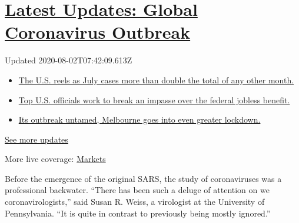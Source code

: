 \hypertarget{latest-updates-global-coronavirus-outbreak}{%
\section{\texorpdfstring{\href{https://www.nytimes.com/2020/08/01/world/coronavirus-covid-19.html?action=click\&pgtype=Article\&state=default\&region=MAIN_CONTENT_1\&context=storylines_live_updates}{Latest
Updates: Global Coronavirus
Outbreak}}{Latest Updates: Global Coronavirus Outbreak}}\label{latest-updates-global-coronavirus-outbreak}}

Updated 2020-08-02T07:42:09.613Z

\begin{itemize}
\tightlist
\item
  \href{https://www.nytimes.com/2020/08/01/world/coronavirus-covid-19.html?action=click\&pgtype=Article\&state=default\&region=MAIN_CONTENT_1\&context=storylines_live_updates\#link-34047410}{The
  U.S. reels as July cases more than double the total of any other
  month.}
\item
  \href{https://www.nytimes.com/2020/08/01/world/coronavirus-covid-19.html?action=click\&pgtype=Article\&state=default\&region=MAIN_CONTENT_1\&context=storylines_live_updates\#link-780ec966}{Top
  U.S. officials work to break an impasse over the federal jobless
  benefit.}
\item
  \href{https://www.nytimes.com/2020/08/01/world/coronavirus-covid-19.html?action=click\&pgtype=Article\&state=default\&region=MAIN_CONTENT_1\&context=storylines_live_updates\#link-2bc8948}{Its
  outbreak untamed, Melbourne goes into even greater lockdown.}
\end{itemize}

\href{https://www.nytimes.com/2020/08/01/world/coronavirus-covid-19.html?action=click\&pgtype=Article\&state=default\&region=MAIN_CONTENT_1\&context=storylines_live_updates}{See
more updates}

More live coverage:
\href{https://www.nytimes.com/live/2020/07/31/business/stock-market-today-coronavirus?action=click\&pgtype=Article\&state=default\&region=MAIN_CONTENT_1\&context=storylines_live_updates}{Markets}

Before the emergence of the original SARS, the study of coronaviruses
was a professional backwater. ``There has been such a deluge of
attention on we coronavirologists,'' said Susan R. Weiss, a virologist
at the University of Pennsylvania. ``It is quite in contrast to
previously being mostly ignored.''

